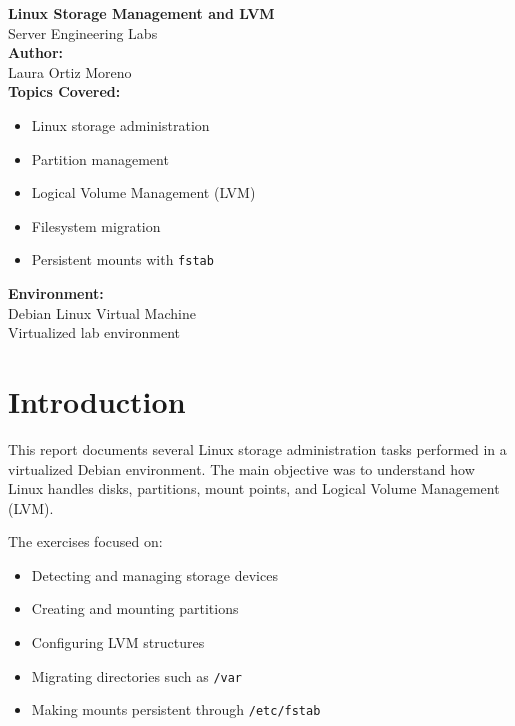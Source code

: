 \documentclass[11pt,a4paper]{article}
\begin{document}
\begin{titlepage}
    \centering

    \vspace*{3cm}

    {\Huge \textbf{Linux Storage Management and LVM}}\\[1cm]

    {\Large Server Engineering Labs}\\[2cm]

    \textbf{Author:}\\
    Laura Ortiz Moreno\\[1cm]

    \textbf{Topics Covered:}
    \begin{itemize}[leftmargin=4cm]
        \item Linux storage administration
        \item Partition management
        \item Logical Volume Management (LVM)
        \item Filesystem migration
        \item Persistent mounts with \texttt{fstab}
    \end{itemize}

    \vfill

    \textbf{Environment:}\\
    Debian Linux Virtual Machine\\
    Virtualized lab environment

    \vspace{1cm}

\end{titlepage}

\tableofcontents
\newpage

\section{Introduction}

This report documents several Linux storage administration tasks performed in a virtualized Debian environment. The main objective was to understand how Linux handles disks, partitions, mount points, and Logical Volume Management (LVM).

The exercises focused on:
\begin{itemize}
    \item Detecting and managing storage devices
    \item Creating and mounting partitions
    \item Configuring LVM structures
    \item Migrating directories such as \texttt{/var}
    \item Making mounts persistent through \texttt{/etc/fstab}
\end{itemize}
\end{document}
